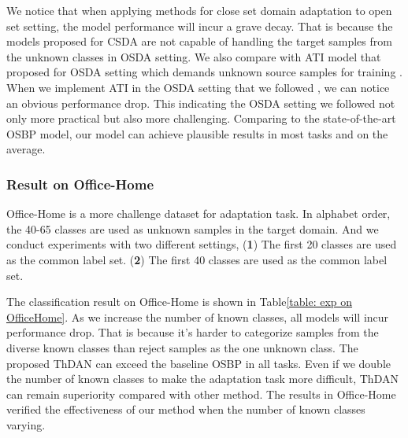 We notice that when applying methods for close set domain adaptation to open set setting, the model performance will incur a grave decay. 
That is because the models proposed for CSDA are not capable of handling the target samples from the unknown classes in OSDA setting.
We also compare with ATI model that proposed for OSDA setting which demands unknown source samples for training \cite{OpensetDA-bp}. 
When we implement ATI in the OSDA setting that we followed \cite{OpensetDA-bp}, we can notice an obvious performance drop.
This indicating the OSDA setting we followed not only more practical but also more challenging.
Comparing to the state-of-the-art OSBP model, our model can achieve plausible results in most tasks and on the average.




\subsubsection{Result on Office-Home}
Office-Home is a more challenge dataset for adaptation task. In alphabet order, the 40-65 classes are used as unknown samples in the target domain. And we conduct experiments with two different settings,
(\textbf{1}) The first 20 classes are used as the common label set.
(\textbf{2}) The first 40 classes are used as the common label set.

The classification result on Office-Home is shown in Table\ref{table: exp on OfficeHome}. 
As we increase the number of known classes, all models will incur performance drop. 
That is because it's harder to categorize samples from the diverse known classes than reject samples as the one unknown class.  
The proposed ThDAN can exceed the baseline OSBP in all tasks. 
Even if we double the number of known classes to make the adaptation task more difficult, ThDAN can remain superiority compared with other method.
The results in Office-Home verified the effectiveness of our method when the number of known classes varying. 

